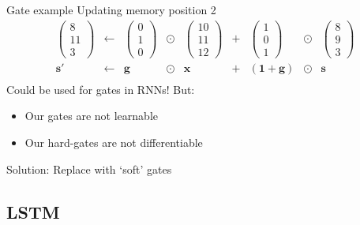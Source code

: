 \documentclass[12pt,aspectratio=169,handout]{beamer}
\begin{document}
	\begin{frame}{Gate example}
		Updating memory position 2
		$$
		\begin{aligned}
			\begin{pmatrix}
				8 \\ 11 \\ 3
			\end{pmatrix}
			&\gets
			&\begin{pmatrix}
				0 \\ 1 \\ 0
			\end{pmatrix}
			&
			\odot
			&\begin{pmatrix}
				10 \\ 11 \\ 12
			\end{pmatrix}
			&+
			&\begin{pmatrix}
				1 \\ 0 \\ 1
			\end{pmatrix}
			&\odot
			&\begin{pmatrix}
				8 \\ 9 \\ 3
			\end{pmatrix}
			\\
			\bm{s'} &\gets &\bm{g} &\odot &\bm{x} &+ &(\bm{1} + \bm{g}) &\odot &\bm{s} \\
		\end{aligned}
		$$
		\pause
		Could be used for gates in RNNs! But:
		\begin{itemize}
			\item Our gates are not learnable
			\item Our hard-gates are not differentiable
		\end{itemize}
		Solution: Replace with `soft' gates
	\end{frame}
	
	\subsection{LSTM}
	
\end{document}
